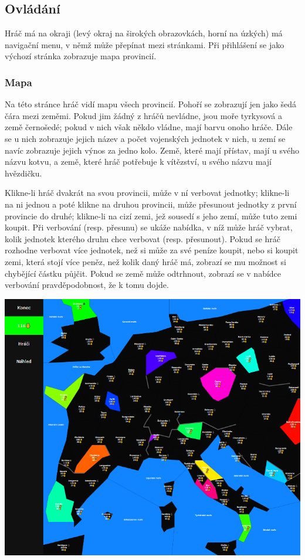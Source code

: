 \documentclass[a4paper,12pt]{article}
\begin{document}
\subsection{Ovládání}
Hráč má na okraji (levý okraj na širokých obrazovkách, horní na úzkých) má navigační menu, v němž může přepínat mezi stránkami. Při přihlášení se jako výchozí stránka zobrazuje mapa provincií.
\subsubsection{Mapa}
Na této stránce hráč vidí mapu všech provincií. Pohoří se zobrazují jen jako šedá čára mezi zeměmi. Pokud jim žádný z hráčů nevládne, jsou moře tyrkysová a země černošedé; pokud v nich však někdo vládne, mají barvu onoho hráče. Dále se u nich zobrazuje jejich název a počet vojenských jednotek v nich, u zemí se navíc zobrazuje jejich výnos za jedno kolo. Země, které mají přístav, mají u svého názvu kotvu, a země, které hráč potřebuje k vítězství, u svého názvu mají hvězdičku.

Klikne-li hráč dvakrát na svou provincii, může v ní verbovat jednotky; klikne-li na ni jednou a poté klikne na druhou provincii, může přesunout jednotky z první provincie do druhé; klikne-li na cizí zemi, jež sousedí s jeho zemí, může tuto zemi koupit. Při verbování (resp. přesunu) se ukáže nabídka, v níž může hráč vybrat, kolik jednotek kterého druhu chce verbovat (resp. přesunout). Pokud se hráč rozhodne verbovat více jednotek, než si může za své peníze koupit, nebo si koupit zemi, která stojí více peněz, než kolik daný hráč má, zobrazí se mu možnost si chybějící částku půjčit. Pokud se země může odtrhnout, zobrazí se v nabídce verbování pravděpodobnost, že k tomu dojde.

\includegraphics[width=\textwidth]{ProvinceMap.png}
\end{document}
